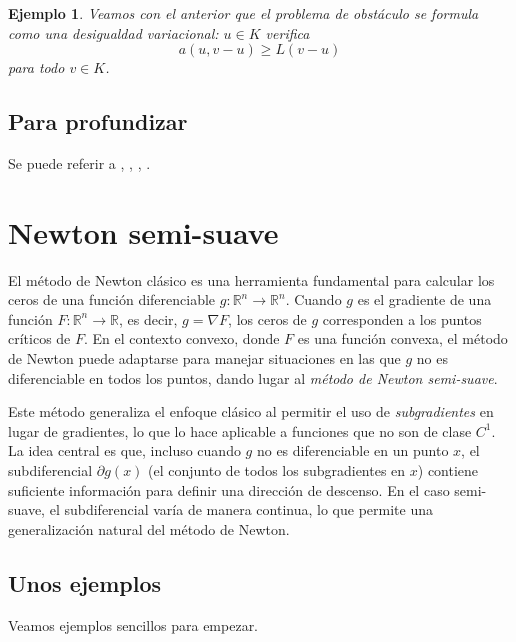 \documentclass[12pt]{book}
\newtheorem{ex}{Ejemplo}
\theoremstyle{definition}
\theoremstyle{plain}
\theoremstyle{remark}
\begin{document}
\begin{ex}
Veamos con el anterior que el problema de obstáculo se formula como una desigualdad variacional: $u\in K$ verifica
\[
a(u,v-u) \geq L(v-u)
\]
para todo $v \in K$.
\end{ex}

\section{Para profundizar}

Se puede referir a \cite{allaire2007},
\cite{brezis2011},
\cite{barbu2012},
\cite{peypouquet2015}.

\chapter{Newton semi-suave}


El método de Newton clásico es una herramienta fundamental para calcular los ceros de una función diferenciable \( g: \mathbb{R}^n \to \mathbb{R}^n \). Cuando \( g \) es el gradiente de una función \( F: \mathbb{R}^n \to \mathbb{R} \), es decir, \( g = \nabla F \), los ceros de \( g \) corresponden a los puntos críticos de \( F \). En el contexto convexo, donde \( F \) es una función convexa, el método de Newton puede adaptarse para manejar situaciones en las que \( g \) no es diferenciable en todos los puntos, dando lugar al \emph{método de Newton semi-suave}.

Este método generaliza el enfoque clásico al permitir el uso de \emph{subgradientes} en lugar de gradientes, lo que lo hace aplicable a funciones que no son de clase \( C^1 \). La idea central es que, incluso cuando \( g \) no es diferenciable en un punto \( x \), el subdiferencial \( \partial g(x) \) (el conjunto de todos los subgradientes en \( x \)) contiene suficiente información para definir una dirección de descenso. En el caso semi-suave, el subdiferencial varía de manera continua, lo que permite una generalización natural del método de Newton.

\section{Unos ejemplos}

Veamos ejemplos sencillos para empezar.
\end{document}
